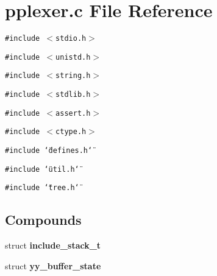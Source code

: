 \section{pplexer.c File Reference}
\label{pplexer_8c}
{\tt \#include $<$stdio.h$>$}\par
{\tt \#include $<$unistd.h$>$}\par
{\tt \#include $<$string.h$>$}\par
{\tt \#include $<$stdlib.h$>$}\par
{\tt \#include $<$assert.h$>$}\par
{\tt \#include $<$ctype.h$>$}\par
{\tt \#include \char`\"{}defines.h\char`\"{}}\par
{\tt \#include \char`\"{}util.h\char`\"{}}\par
{\tt \#include \char`\"{}tree.h\char`\"{}}\par
\subsection*{Compounds}
\begin{CompactItemize}
\item 
struct {\bf include\_\-stack\_\-t}
\item 
struct {\bf yy\_\-buffer\_\-state}
\end{CompactItemize}
